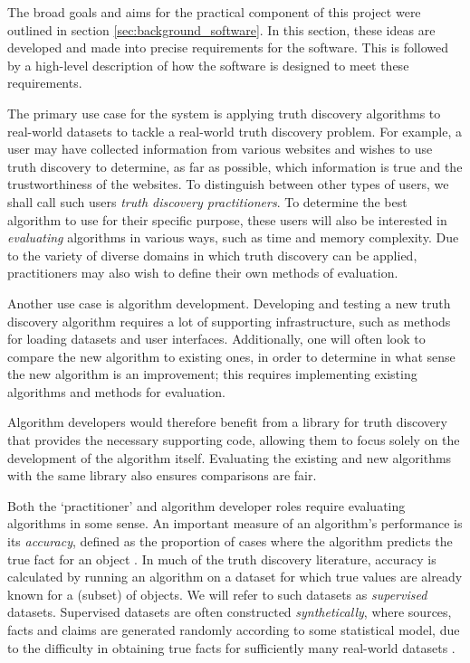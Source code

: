 \documentclass[../main.tex]{subfiles}
\begin{document}
The broad goals and aims for the practical component of this project were
outlined in section \ref{sec:background_software}. In this section, these ideas
are developed and made into precise requirements for the software. This is
followed by a high-level description of how the software is designed to meet
these requirements.

The primary use case for the system is applying truth discovery algorithms to
real-world datasets to tackle a real-world truth discovery problem. For
example, a user may have collected information from various websites and wishes
to use truth discovery to determine, as far as possible, which information is
true and the trustworthiness of the websites. To distinguish between other
types of users, we shall call such users \emph{truth discovery practitioners}.
To determine the best algorithm to use for their specific purpose, these users
will also be interested in \emph{evaluating} algorithms in various ways, such
as time and memory complexity. Due to the variety of diverse domains in which
truth discovery can be applied, practitioners may also wish to define their own
methods of evaluation.

Another use case is algorithm development. Developing and testing a new truth
discovery algorithm requires a lot of supporting infrastructure, such as
methods for loading datasets and user interfaces. Additionally, one will often
look to compare the new algorithm to existing ones, in order to determine in
what sense the new algorithm is an improvement; this requires implementing
existing algorithms and methods for evaluation.

Algorithm developers would therefore benefit from a library for truth discovery
that provides the necessary supporting code, allowing them to focus solely on
the development of the algorithm itself. Evaluating the existing and new
algorithms with the same library also ensures comparisons are fair.

Both the `practitioner' and algorithm developer roles require evaluating
algorithms in some sense. An important measure of an algorithm's performance is
its \emph{accuracy}, defined as the proportion of cases where the algorithm
predicts the true fact for an object \cite{pasternack,
li_deep_web}.\footnotemark{} In much of the truth discovery literature, accuracy
is calculated by running an algorithm on a dataset for which true values are
already known for a (subset) of objects. We will refer to such datasets as
\emph{supervised} datasets. Supervised datasets are often constructed
\emph{synthetically}, where sources, facts and claims are generated randomly
according to some statistical model, due to the difficulty in obtaining true
facts for sufficiently many real-world datasets \cite{galland, pasternack,
yin_han_yu, li_conflicts}.
\end{document}
